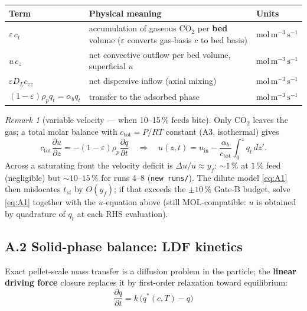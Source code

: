 \documentclass[11pt]{article}
\theoremstyle{remark}
\newtheorem{remark}{Remark}
\begin{document}
\begin{center}
\begin{tabular}{@{}l p{8cm} l@{}}
\toprule
Term & Physical meaning & Units \\
\midrule
$\varepsilon\,c_t$ & accumulation of gaseous CO$_2$ per \textbf{bed} volume
  ($\varepsilon$ converts gas-basis $c$ to bed basis) & $\mathrm{mol\,m^{-3}\,s^{-1}}$ \\
$u\,c_z$ & net convective outflow per bed volume, superficial $u$ & $\mathrm{mol\,m^{-3}\,s^{-1}}$ \\
$\varepsilon D_L c_{zz}$ & net dispersive inflow (axial mixing) & $\mathrm{mol\,m^{-3}\,s^{-1}}$ \\
$(1-\varepsilon)\rho_p q_t = \alpha_b q_t$ & transfer to the adsorbed phase & $\mathrm{mol\,m^{-3}\,s^{-1}}$ \\
\bottomrule
\end{tabular}
\end{center}

\begin{remark}[variable velocity --- when 10--15\,\% feeds bite]\label{rem:A1}
Only CO$_2$ leaves the gas; a total molar balance with $c_{\mathrm{tot}}=P/RT$
constant (A3, isothermal) gives
\begin{equation*}
c_{\mathrm{tot}}\frac{\partial u}{\partial z} = -(1-\varepsilon)\rho_p\frac{\partial q}{\partial t}
\quad\Longrightarrow\quad
u(z,t)=u_{\mathrm{in}}-\frac{\alpha_b}{c_{\mathrm{tot}}}\int_0^z q_t\,dz'.
\end{equation*}
Across a saturating front the velocity deficit is $\Delta u/u \approx y_f$:
${\sim}1\,\%$ at $1\,\%$ feed (negligible) but ${\sim}10$--$15\,\%$ for runs 4--8
(\texttt{new runs/}). The dilute model \eqref{eq:A1} then mislocates $t_{st}$ by
$O(y_f)$; if that exceeds the $\pm10\,\%$ Gate-B budget, solve \eqref{eq:A1}
together with the $u$-equation above (still MOL-compatible: $u$ is obtained by
quadrature of $q_t$ at each RHS evaluation).
\end{remark}

\subsection*{A.2 Solid-phase balance: LDF kinetics}

Exact pellet-scale mass transfer is a diffusion problem in the particle; the
\textbf{linear driving force} closure replaces it by first-order relaxation toward
equilibrium:
\begin{equation}
\boxed{\;\frac{\partial q}{\partial t} = k\,\bigl(q^*(c,T)-q\bigr)\;}
\tag{A.2}\label{eq:A2}
\end{equation}
\end{document}
